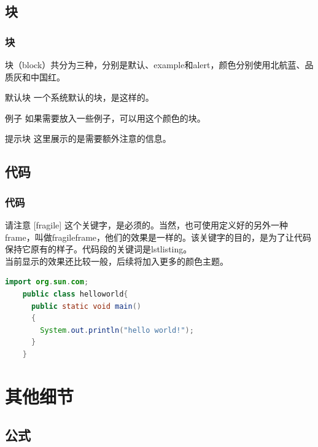 \documentclass[aspectratio=169,UTF8,t]{beamer}%
\begin{document}
\subsection{块}

\begin{frame}
    \frametitle{块}
    块（block）共分为三种，分别是默认、example和alert，颜色分别使用北航蓝、品质灰和中国红。
    \begin{block}{默认块}
        一个系统默认的块，是这样的。
    \end{block}

    \begin{exampleblock}{例子}
        如果需要放入一些例子，可以用这个颜色的块。
    \end{exampleblock}

    \begin{alertblock}{提示块}
        这里展示的是需要额外注意的信息。
    \end{alertblock}
\end{frame}

\subsection{代码}

\begin{frame}[fragile]
    \frametitle{代码}
    
    请注意 [fragile] 这个关键字，是必须的。当然，也可使用定义好的另外一种frame，叫做fragileframe，他们的效果是一样的。该关键字的目的，是为了让代码保持它原有的样子。代码段的关键词是lstlisting。\\
    当前显示的效果还比较一般，后续将加入更多的颜色主题。

\begin{lstlisting}[language=Java,caption={src/app/app.module.ts}]
    import org.sun.com;   
    public class helloworld{
      public static void main()
      {
        System.out.println("hello world!");
      }
    }
    \end{lstlisting}
\end{frame}

\section{其他细节}

\subsection{公式}
\end{document}
